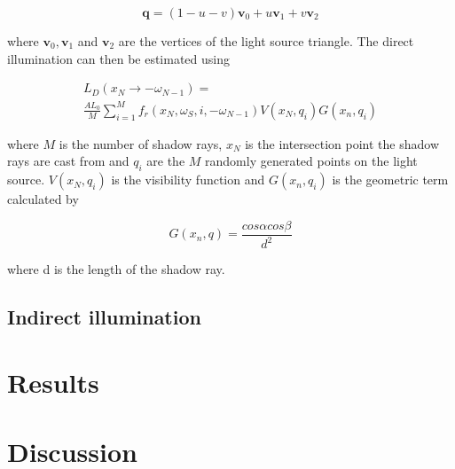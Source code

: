 \documentclass[twocolumn]{article}
\begin{document}
\begin{equation*}
	\mathbf{q} = (1 - u - v)\mathbf{v}_0 + u\mathbf{v}_1 + v\mathbf{v}_2
\end{equation*}

where $\mathbf{v}_0, \mathbf{v}_1$ and $\mathbf{v}_2$ are the vertices of the light source triangle. The direct illumination can then be estimated using

\begin{align*}
	L_D(x_N \rightarrow -\omega_{N-1}) = \\
	 \frac{AL_0}{M} \sum_{i=1}^{M}f_r(x_N, \omega_S, i, -\omega_{N-1})V(x_N, q_i)G(x_n, q_i)
\end{align*}

where $M$ is the number of shadow rays, $x_N$ is the intersection point the shadow rays are cast from and $q_i$ are the $M$ randomly generated points on the light source. $V(x_N, q_i)$ is the visibility function and $G(x_n, q_i)$ is the geometric term calculated by 

\begin{equation*}
	G(x_n, q) = \frac{cos\alpha cos\beta}{d^2}
\end{equation*}

where d is the length of the shadow ray.

\subsection{Indirect illumination}

\section{Results}

\section{Discussion}


\newpage
\printbibliography
\end{document}

